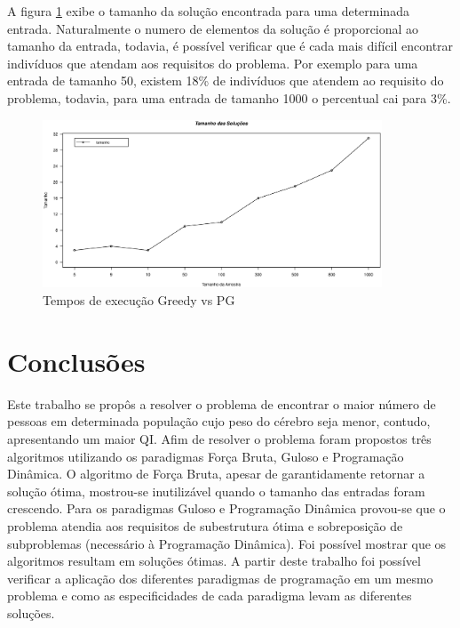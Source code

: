 \documentclass[12pt]{article}
\begin{document}
A figura \ref{fig:tamanho_solucoes} exibe o tamanho da solução encontrada para uma determinada entrada. Naturalmente o numero de elementos da solução é proporcional ao tamanho da entrada, todavia, é possível verificar que é cada mais difícil encontrar indivíduos que atendam aos requisitos do problema. Por exemplo para uma entrada de tamanho 50, existem 18\% de indivíduos que atendem ao requisito do problema, todavia, para uma entrada de tamanho 1000 o percentual cai para 3\%{}.

\begin{figure}[ht]
\centering
\includegraphics[width=0.9\textwidth]{tamanho_solucoes.eps}
\caption{Tempos de execução Greedy vs PG}
\label{fig:tamanho_solucoes}
\end{figure}


\section{Conclusões}
\label{sec:conclusao}

Este trabalho se propôs a resolver o problema de encontrar o maior número de pessoas em determinada população cujo peso do cérebro seja menor, contudo, apresentando um maior QI. Afim de resolver o problema foram propostos três algoritmos utilizando os paradigmas Força Bruta, Guloso e Programação Dinâmica. O algoritmo de Força Bruta, apesar de garantidamente retornar a solução ótima, mostrou-se inutilizável quando o tamanho das entradas foram crescendo. Para os paradigmas Guloso e Programação Dinâmica provou-se que o problema atendia aos requisitos de subestrutura ótima e sobreposição de subproblemas (necessário à Programação Dinâmica). Foi possível mostrar que os algoritmos resultam em soluções ótimas. A partir deste trabalho foi possível verificar a aplicação dos diferentes paradigmas de programação em um mesmo problema e como as especificidades de cada paradigma levam as diferentes soluções.



\end{document}
